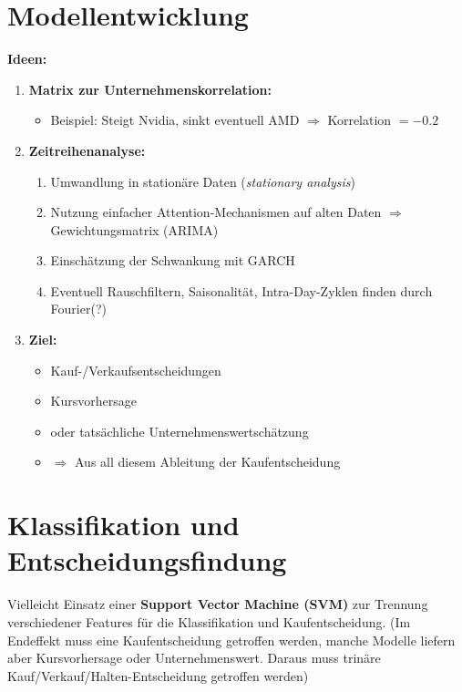 \section*{Modellentwicklung}

\textbf{Ideen:}

\begin{enumerate}
    \item \textbf{Matrix zur Unternehmenskorrelation:}
          \begin{itemize}
              \item Beispiel: Steigt Nvidia, sinkt eventuell AMD $\Rightarrow$ Korrelation $=-0.2$
          \end{itemize}

    \item \textbf{Zeitreihenanalyse:}
          \begin{enumerate}
              \item Umwandlung in stationäre Daten (\textit{stationary analysis})
              \item Nutzung einfacher Attention-Mechanismen auf alten Daten $\Rightarrow$ Gewichtungsmatrix (ARIMA)
              \item Einschätzung der Schwankung mit GARCH
              \item Eventuell Rauschfiltern, Saisonalität, Intra-Day-Zyklen finden durch Fourier(?)
          \end{enumerate}

    \item \textbf{Ziel:}
          \begin{itemize}
              \item Kauf-/Verkaufsentscheidungen
              \item Kursvorhersage
              \item oder tatsächliche Unternehmenswertschätzung
              \item $\Rightarrow$ Aus all diesem Ableitung der Kaufentscheidung
          \end{itemize}
\end{enumerate}

\section*{Klassifikation und Entscheidungsfindung}

Vielleicht Einsatz einer \textbf{Support Vector Machine (SVM)} zur Trennung verschiedener Features für die Klassifikation und Kaufentscheidung.
(Im Endeffekt muss eine Kaufentscheidung getroffen werden, manche Modelle liefern aber Kursvorhersage oder Unternehmenswert. Daraus muss trinäre Kauf/Verkauf/Halten-Entscheidung getroffen werden)

